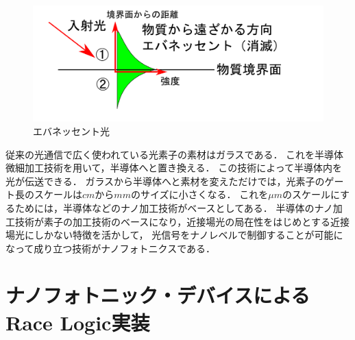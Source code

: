 \begin{figure}[t!]
\begin{center}
\includegraphics[keepaspectratio,scale=0.5]{fig/3/evanesent2.pdf}
\caption{エバネッセント光}
\label{fig:eva2}
\end{center}
\end{figure}
従来の光通信で広く使われている光素子の素材はガラスである．
これを半導体微細加工技術を用いて，半導体へと置き換える．
この技術によって半導体内を光が伝送できる．
ガラスから半導体へと素材を変えただけでは，光素子のゲート長のスケールは$cmからmm$のサイズに小さくなる．
これを$ \mu m$のスケールにするためには，半導体などのナノ加工技術がベースとしてある．
半導体のナノ加工技術が素子の加工技術のベースになり，近接場光の局在性をはじめとする近接場光にしかない特徴を活かして，
光信号をナノレベルで制御することが可能になって成り立つ技術がナノフォトニクスである．
\section{ナノフォトニック・デバイスによるRace Logic実装}
